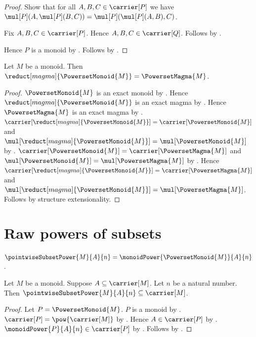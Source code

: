 \begin{proof}
    Show that for all $A,B,C\in\carrier[P]$ we have
        $\mul[P](A,\mul[P](B,C))
            =\mul[P](\mul[P](A,B),C)$.
    \begin{subproof}
        Fix $A,B,C\in\carrier[P]$.
        Hence $A,B,C\in\carrier[Q]$.
        Follows by .
    \end{subproof}
    Hence $P$ is a monoid by
        .
    Follows by
        .
\end{proof}

\begin{theorem}\label{powerset_monoid_magma_reduct}
    Let $M$ be a monoid.
    Then $\reduct[magma]{\PowersetMonoid{M}}=\PowersetMagma{M}$.
\end{theorem}
\begin{proof}
    $\PowersetMonoid{M}$ is an exact monoid by
        .
    Hence $\reduct[magma]{\PowersetMonoid{M}}$ is an exact magma by
        .
    Hence $\PowersetMagma{M}$ is an exact magma by
        .
    $\carrier[\reduct[magma]{\PowersetMonoid{M}}]
        =\carrier[\PowersetMonoid{M}]$ and
        $\mul[\reduct[magma]{\PowersetMonoid{M}}]
            =\mul[\PowersetMonoid{M}]$ by
        .
    $\carrier[\PowersetMonoid{M}]=\carrier[\PowersetMagma{M}]$ and
        $\mul[\PowersetMonoid{M}]=\mul[\PowersetMagma{M}]$ by
        .
    Hence
        $\carrier[\reduct[magma]{\PowersetMonoid{M}}]
            =\carrier[\PowersetMagma{M}]$ and
        $\mul[\reduct[magma]{\PowersetMonoid{M}}]
            =\mul[\PowersetMagma{M}]$.
    Follows by structure extensionality.
\end{proof}

\section{Raw powers of subsets}

\begin{definition}\label{pointwise_subset_power}
    $\pointwiseSubsetPower{M}{A}{n}
        =\monoidPower{\PowersetMonoid{M}}{A}{n}$.
\end{definition}

\begin{proposition}\label{pointwise_subset_power_type}
    Let $M$ be a monoid.
    Suppose $A\subseteq\carrier[M]$.
    Let $n$ be a natural number.
    Then $\pointwiseSubsetPower{M}{A}{n}\subseteq\carrier[M]$.
\end{proposition}
\begin{proof}
    Let $P=\PowersetMonoid{M}$.
    $P$ is a monoid by .
    $\carrier[P]=\pow{\carrier[M]}$ by
        .
    Hence $A\in\carrier[P]$ by .
    $\monoidPower{P}{A}{n}\in\carrier[P]$ by
        .
    Follows by
        .
\end{proof}

